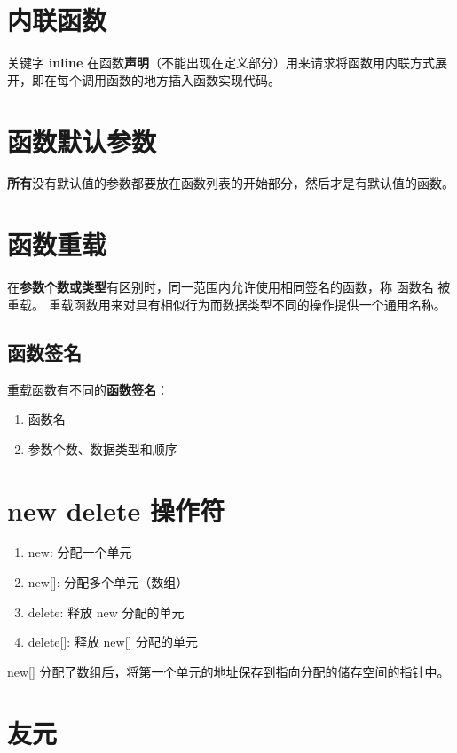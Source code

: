 \section{内联函数}

关键字 \textbf{inline} 在函数\textbf{声明}（不能出现在定义部分）用来请求将函数用内联方式展开，即在每个调用函数的地方插入函数实现代码。

\section{函数默认参数}

\textbf{所有}没有默认值的参数都要放在函数列表的开始部分，然后才是有默认值的函数。

\section{函数重载}

在\textbf{参数个数或类型}有区别时，同一范围内允许使用相同签名的函数，称 函数名 被重载。
重载函数用来对具有相似行为而数据类型不同的操作提供一个通用名称。

\subsection{函数签名}

重载函数有不同的\textbf{函数签名}：

\begin{enumerate}
    \item 函数名
    \item 参数个数、数据类型和顺序
\end{enumerate}

\section{new delete 操作符}

\begin{enumerate}
    \item new: 分配一个单元
    \item new[]: 分配多个单元（数组）
    \item delete: 释放 new 分配的单元
    \item delete[]: 释放 new[] 分配的单元
\end{enumerate}

new[] 分配了数组后，将第一个单元的地址保存到指向分配的储存空间的指针中。

\section{友元}

